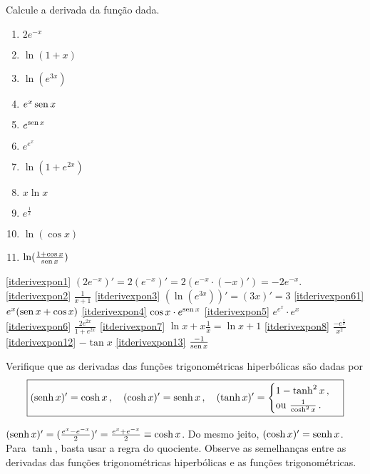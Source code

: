 \begin{exo}
Calcule a derivada da função dada.
\begin{multicols}{4}
\begin{enumerate}
\item\label{itderivexpon1} $2e^{-x}$
\item\label{itderivexpon2} $\ln (1+x)$
\item\label{itderivexpon3} $\ln (e^{3x})$ 
\item\label{itderivexpon61} $e^x\operatorname{sen} x$
\item\label{itderivexpon4} $e^{\operatorname{sen} x}$
\item\label{itderivexpon5} $e^{e^x}$
\item\label{itderivexpon6} $\ln(1+e^{2x})$
\item\label{itderivexpon7} $x\ln x$
\item\label{itderivexpon8} $e^{\frac1x}$
\item\label{itderivexpon12} $\ln(\cos x)$
\item\label{itderivexpon13} $\ln(\frac{1+\cos x}{\operatorname{sen} x})$
\end{enumerate}
\end{multicols}
\vspace{0.01cm}
\begin{sol}
\eqref{itderivexpon1} $(2e^{-x})'=2(e^{-x})'=2(e^{-x}\cdot(-x)')=-2e^{-x}$.
\eqref{itderivexpon2} $\frac{1}{x+1}$
\eqref{itderivexpon3} $(\ln (e^{3x}))'=(3x)'=3$
\eqref{itderivexpon61} $e^x(\operatorname{sen} x+\cos x)$
\eqref{itderivexpon4} $\cos x \cdot e^{\operatorname{sen} x}$
\eqref{itderivexpon5} $e^{e^x}\cdot e^x$
\eqref{itderivexpon6} $\frac{2e^{2x}}{1+e^{2x}}$
\eqref{itderivexpon7} $\ln x+x\frac{1}{x}=\ln x+1$
\eqref{itderivexpon8} $\frac{-e^{\frac1x}}{x^2}$
\eqref{itderivexpon12} $-\tan x$
\eqref{itderivexpon13} $\frac{-1}{\operatorname{sen} x}$
\end{sol}
\end{exo}

\begin{exo}
Verifique que as derivadas das funções trigonométricas hiperbólicas são
dadas por 
\[
\boxed{(\operatorname{senh} x)'=\cosh x\,,\quad (\cosh x)'=\operatorname{senh} x\,,\quad (\tanh x)'=
\begin{cases}
1-\tanh^2 x\,,\\
\text{ou }\frac{1}{\cosh^2 x}\,.
\end{cases}
}
\]
\begin{sol}
$(\operatorname{senh}
x)'=(\frac{e^x-e^{-x}}{2})'=\frac{e^x+e^{-x}}{2}\equiv \cosh x$.
Do mesmo jeito, $(\cosh x)'=\operatorname{senh} x$.
Para $\tanh$, basta usar a regra do quociente.
Observe as semelhanças entre as derivadas das funções trigonométricas
hiperbólicas e as funções trigonométricas.
\end{sol}
\end{exo}

